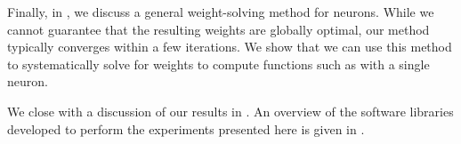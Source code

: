 Finally, in , we discuss a general weight-solving method for \nlif neurons.
While we cannot guarantee that the resulting weights are globally optimal, our method typically converges within a few iterations.
We show that we can use this method to systematically solve for weights to compute functions such as \XOR with a single neuron.

We close with a discussion of our results in .
An overview of the software libraries developed to perform the experiments presented here is given in .
